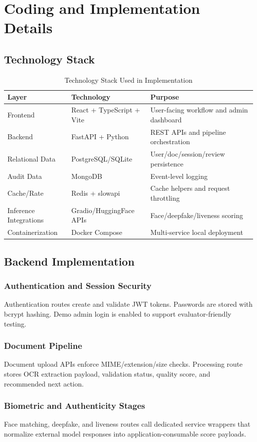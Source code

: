 \chapter{Coding and Implementation Details}

\section{Technology Stack}
\begin{longtable}{p{3.5cm}p{3.5cm}p{6.0cm}}
\caption{Technology Stack Used in Implementation}\\
\toprule
Layer & Technology & Purpose \\
\midrule
Frontend & React + TypeScript + Vite & User-facing workflow and admin dashboard \\
Backend & FastAPI + Python & REST APIs and pipeline orchestration \\
Relational Data & PostgreSQL/SQLite & User/doc/session/review persistence \\
Audit Data & MongoDB & Event-level logging \\
Cache/Rate & Redis + slowapi & Cache helpers and request throttling \\
Inference Integrations & Gradio/HuggingFace APIs & Face/deepfake/liveness scoring \\
Containerization & Docker Compose & Multi-service local deployment \\
\bottomrule
\end{longtable}

\section{Backend Implementation}
\subsection{Authentication and Session Security}
Authentication routes create and validate JWT tokens. Passwords are stored with bcrypt hashing. Demo admin login is enabled to support evaluator-friendly testing.

\subsection{Document Pipeline}
Document upload APIs enforce MIME/extension/size checks. Processing route stores OCR extraction payload, validation status, quality score, and recommended next action.

\subsection{Biometric and Authenticity Stages}
Face matching, deepfake, and liveness routes call dedicated service wrappers that normalize external model responses into application-consumable score payloads.

